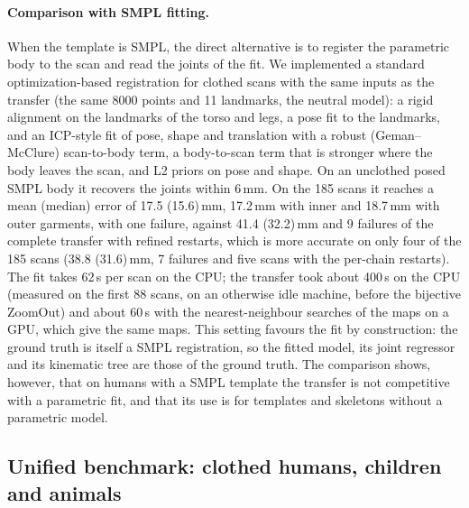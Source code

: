\documentclass[11pt]{article}
\begin{document}
\paragraph{Comparison with SMPL fitting.}
When the template is SMPL, the direct alternative is to register the
parametric body to the scan and read the joints of the fit. We implemented a
standard optimization-based registration for clothed scans with the same
inputs as the transfer (the same 8000 points and 11 landmarks, the neutral
model): a rigid alignment on the landmarks of the torso and legs, a pose fit
to the landmarks, and an ICP-style fit of pose, shape and translation with a
robust (Geman--McClure) scan-to-body term, a body-to-scan term that is
stronger where the body leaves the scan, and L2 priors on pose and shape. On
an unclothed posed SMPL body it recovers the joints within 6\,mm. On the 185
scans it reaches a mean (median) error of 17.5 (15.6)\,mm, 17.2\,mm with inner
and 18.7\,mm with outer garments, with one failure, against 41.4 (32.2)\,mm and
9 failures of the complete transfer with refined restarts, which is more
accurate on only four of the 185 scans (38.8 (31.6)\,mm, 7 failures and five
scans with the per-chain restarts). The fit takes 62\,s per scan on the CPU; the transfer took
about 400\,s on the CPU (measured on the first 88 scans, on an otherwise idle
machine, before the bijective ZoomOut) and about 60\,s with the
nearest-neighbour searches of the maps on a GPU, which give the same maps. This
setting favours the fit by construction: the ground truth is itself a SMPL
registration, so the fitted model, its joint regressor and its kinematic tree
are those of the ground truth. The comparison shows, however, that on humans
with a SMPL template the transfer is not competitive with a parametric fit,
and that its use is for templates and skeletons without a parametric model.

\subsection{Unified benchmark: clothed humans, children and animals}
\label{sec:exp_unified}
\end{document}
